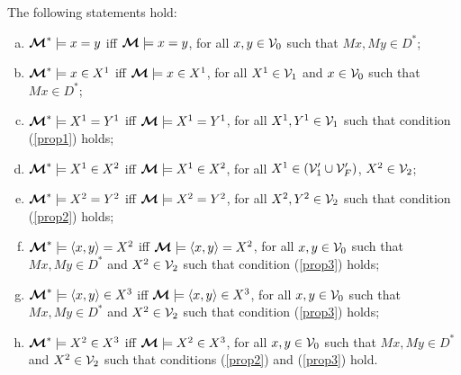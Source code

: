 \documentclass{fundam}
\newcommand{\model}{\ensuremath{\mbox{\boldmath $\mathcal{M}$}}\xspace}
\begin{document}
\begin{lemma}
\label{le_basic} The following statements hold:
\begin{enumerate}[(a)]
    \item \label{le1} $\model^{*} \models x = y$ iff $\model \models x
    = y$, for all $x,y \in {\cal V}_{0}$ such that $Mx, My \in D^{*}$;

    \item \label{le2} $\model^{*} \models x \in X^1$ iff $\model
    \models x \in X^1$, for all $X^1 \in {\cal V}_{1}$ and $x \in
    {\cal V}_{0}$ such that $Mx \in D^{*}$;

    \item \label{le3} $\model^{*} \models X^1 = Y^1$ iff $\model
    \models X^1 = Y^1$, for all $X^1,Y^1 \in {\cal V}_{1}$ such that
    condition (\ref{prop1}) holds;

    \item \label{le4} $\model^{*} \models X^1 \in X^2$ iff $\model
    \models X^1 \in X^2$, for all $X^1 \in ({\cal V}'_{1}\cup {\cal
    V}'_{F})$, $X^2 \in {\cal V}_{2}$;

    \item \label{le5} $\model^{*} \models X^2 = Y^2$ iff $\model
    \models X^2 = Y^2$, for all $X^2,Y^2 \in {\cal V}_{2}$ such that
    condition (\ref{prop2}) holds;

    \item \label{le6} $\model^{*} \models \langle x,y \rangle = X^2$
    iff $\model \models \langle x,y \rangle = X^2$, for all $x,y \in
    {\cal V}_{0}$ such that $Mx,My \in D^*$ and $X^2 \in {\cal V}_{2}$
    such that condition (\ref{prop3}) holds;

    \item \label{le7} $\model^{*} \models \langle x,y \rangle \in X^3$
    iff $\model \models \langle x,y \rangle \in X^3$, for all $x,y \in
    {\cal V}_{0}$ such that $Mx,My \in D^*$ and $X^2 \in {\cal V}_{2}$
    such that condition (\ref{prop3}) holds;

    \item \label{le8} $\model^{*} \models X^2 \in X^3$ iff $\model
    \models X^2 \in X^3$, for all $x,y \in {\cal V}_{0}$ such that
    $Mx,My \in D^*$ and $X^2 \in {\cal V}_{2}$ such that conditions
    (\ref{prop2}) and (\ref{prop3}) hold.
\end{enumerate}
\end{lemma}
\end{document}
